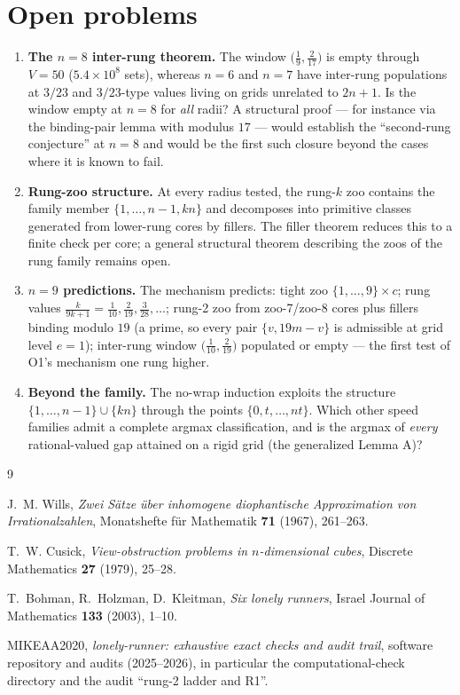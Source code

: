 \documentclass[11pt,a4paper]{article}
\theoremstyle{plain}
\theoremstyle{definition}
\theoremstyle{remark}
\begin{document}
\section{Open problems}\label{sec:open}

\begin{enumerate}[label=\textbf{O\arabic*.}, leftmargin=*]
\item \textbf{The $n = 8$ inter-rung theorem.} The window
$\bigl(\tfrac19, \tfrac{2}{17}\bigr)$ is empty through $V = 50$
($5.4 \times 10^8$ sets), whereas $n = 6$ and $n = 7$ have inter-rung
populations at $3/23$ and $3/23$-type values living on grids unrelated to
$2n+1$. Is the window empty at $n = 8$ for \emph{all} radii? A structural
proof --- for instance via the binding-pair lemma with modulus $17$ ---
would establish the ``second-rung conjecture'' at $n = 8$ and would be the
first such closure beyond the cases where it is known to fail.
\item \textbf{Rung-zoo structure.} At every radius tested, the rung-$k$ zoo
contains the family member $\{1, \dots, n-1, kn\}$ and decomposes into
primitive classes generated from lower-rung cores by fillers. The filler
theorem reduces this to a finite check per core; a general structural
theorem describing the zoos of the rung family remains open.
\item \textbf{$n = 9$ predictions.} The mechanism predicts: tight zoo
$\{1, \dots, 9\} \times c$; rung values $\tfrac{k}{9k+1} =
\tfrac1{10}, \tfrac2{19}, \tfrac3{28}, \dots$; rung-2 zoo from zoo-7/zoo-8
cores plus fillers binding modulo $19$ (a prime, so every pair
$\{v, 19m - v\}$ is admissible at grid level $e = 1$); inter-rung window
$\bigl(\tfrac1{10}, \tfrac2{19}\bigr)$ populated or empty --- the
first test of O1's mechanism one rung higher.
\item \textbf{Beyond the family.} The no-wrap induction exploits the
structure $\{1, \dots, n-1\} \cup \{kn\}$ through the points
$\{0, t, \dots, nt\}$. Which other speed families admit a complete argmax
classification, and is the argmax of \emph{every} rational-valued gap
attained on a rigid grid (the generalized Lemma A)?
\end{enumerate}

\begin{thebibliography}{9}

J.~M. Wills,
\emph{Zwei S\"atze \"uber inhomogene diophantische Approximation von
Irrationalzahlen},
Monatshefte f\"ur Mathematik \textbf{71} (1967), 261--263.

T.~W. Cusick,
\emph{View-obstruction problems in $n$-dimensional cubes},
Discrete Mathematics \textbf{27} (1979), 25--28.

T.~Bohman, R.~Holzman, D.~Kleitman,
\emph{Six lonely runners},
Israel Journal of Mathematics \textbf{133} (2003), 1--10.

MIKEAA2020,
\emph{lonely-runner: exhaustive exact checks and audit trail},
software repository and audits (2025--2026), in particular the
computational-check directory and the audit ``rung-2 ladder and R1''.

\end{thebibliography}
\end{document}
